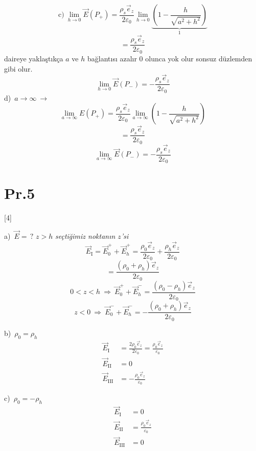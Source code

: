\documentclass[11pt,a4paper]{article}
\begin{document}
\[ \text{c)}\ \lim_{h\to0}\vec E(P_+)=\frac{\rho_s\vec e_z}{2\varepsilon_0}\lim_{h\to0}\underbrace{\left(1-\frac{h}{\sqrt{a^2+h^2}}\right)}_{1} \]
\[ =\frac{\rho_s\vec e_z}{2\varepsilon_0} \]
\noindent daireye yaklaştıkça $a$ ve $h$ bağlantısı azalır $0$ olunca yok olur sonsuz düzlemden gibi olur.
\[ \lim_{h\to0}\vec E(P_-)=-\frac{\rho_s\vec e_z}{2\varepsilon_0} \]
\noindent d)\ $a\to\infty\ \rightarrow$
\[ \lim_{a\to\infty}E(P_+)=\frac{\rho_s\vec e_z}{2\varepsilon_0}\lim_{a\to\infty}\left(1-\frac{h}{\sqrt{a^2+h^2}}\right) \]
\[ =\frac{\rho_s\vec e_z}{2\varepsilon_0} \]
\[ \lim_{a\to\infty}\vec E(P_-)=-\frac{\rho_s\vec e_z}{2\varepsilon_0} \]

\section{Pr.5}
[4]

\noindent a)\ $\vec E=\,?$ \qquad $z>h$ \quad\textit{seçtiğimiz noktanın $z$'si}
\[ \vec E_{\mathrm{I}}=\vec E_0^{+}+\vec E_h^{+}=\frac{\rho_0\vec e_z}{2\varepsilon_0}+\frac{\rho_h\vec e_z}{2\varepsilon_0} \]
\[ =\frac{(\rho_0+\rho_h)\vec e_z}{2\varepsilon_0} \]
\[ 0<z<h\ \Rightarrow\ \vec E_0^{+}+\vec E_h^{-}=\frac{(\rho_0-\rho_h)\vec e_z}{2\varepsilon_0} \]
\[ z<0\ \Rightarrow\ \vec E_0^{-}+\vec E_h^{-}=-\frac{(\rho_0+\rho_h)\vec e_z}{2\varepsilon_0} \]

\noindent b)\ $\rho_0=\rho_h$
\[ \begin{aligned}
\vec E_{\mathrm{I}}&=\frac{2\rho_0\vec e_z}{2\varepsilon_0}=\frac{\rho_0\vec e_z}{\varepsilon_0}\\
\vec E_{\mathrm{II}}&=0\\
\vec E_{\mathrm{III}}&=-\frac{\rho_0\vec e_z}{\varepsilon_0}
\end{aligned} \]

\noindent c)\ $\rho_0=-\rho_h$
\[ \begin{aligned}
\vec E_{\mathrm{I}}&=0\\
\vec E_{\mathrm{II}}&=\frac{\rho_0\vec e_z}{\varepsilon_0}\\
\vec E_{\mathrm{III}}&=0
\end{aligned} \]
\end{document}

